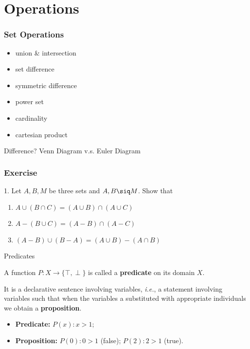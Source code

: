 \documentclass[xcolor=table]{beamer}
\begin{document}
\section{Operations}
\begin{frame}
    \frametitle{Set Operations}
    \begin{itemize}
        \item union \& intersection
        \item set difference
        \item symmetric difference
        \item power set
        \item cardinality
        \item cartesian product
    \end{itemize}
    \vv
    \begin{block}{Difference?}
        Venn Diagram v.s. Euler Diagram 
    \end{block}
\end{frame}
\begin{frame}
    \frametitle{Exercise}
    1. Let $A, B, M$ be three sets and $A, B \siq M$. Show that
    \begin{enumerate}
        \item $A \cup(B \cap C)=(A \cup B) \cap(A \cup C)$
        \item $A-(B \cup C)=(A-B) \cap(A-C)$
        \item $(A - B) \cup (B - A) = (A \cup B) - (A \cap B)$
    \end{enumerate}
    \vv
\end{frame}
\begin{frame}{Predicates}
    \par A function $P: X \to \{\top, \perp \}$ is called a \textbf{predicate} on its domain $X$. 
    \\\vv
    \par It is a declarative sentence involving variables, \textit{i.e.}, a statement involving variables such that when the variables a substituted with appropriate individuals we obtain a \textbf{proposition}.
    \\\vv
    \begin{itemize}
        \item \textbf{Predicate:} $P(x): x>1$;
        \item \textbf{Proposition:} $P(0): 0>1$ (false); $P(2): 2>1$ (true).
    \end{itemize}
\end{frame}
\end{document}
